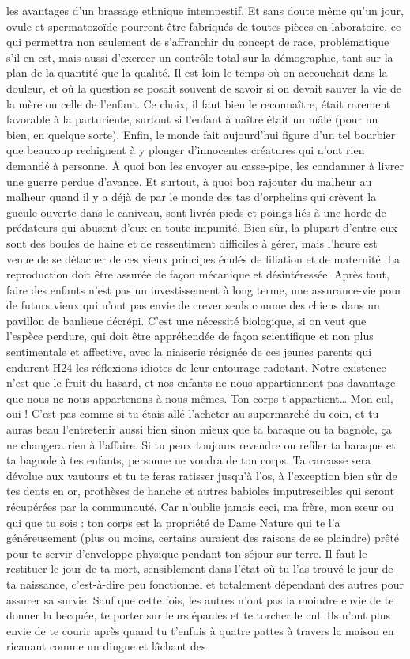 les avantages d’un brassage ethnique intempestif. Et sans doute même qu’un jour, ovule et spermatozoïde pourront être fabriqués de toutes pièces en laboratoire, ce qui permettra non seulement de s’affranchir du concept de race, problématique s’il en est, mais aussi d’exercer un contrôle total sur la démographie, tant sur la plan de la quantité que la qualité. Il est loin le temps où on accouchait dans la douleur, et où la question se posait souvent de savoir si on devait sauver la vie de la mère ou celle de l’enfant. Ce choix, il faut bien le reconnaître, était rarement favorable à la parturiente, surtout si l’enfant à naître était un mâle (pour un bien, en quelque sorte). Enfin, le monde fait aujourd’hui figure d’un tel bourbier que beaucoup rechignent à y plonger d’innocentes créatures qui n’ont rien demandé à personne. À quoi bon les envoyer au casse-pipe, les condamner à livrer une guerre perdue d’avance. Et surtout, à quoi bon rajouter du malheur au malheur quand il y a déjà de par le monde des tas d’orphelins qui crèvent la gueule ouverte dans le caniveau, sont livrés pieds et poings liés à une horde de prédateurs qui abusent d’eux en toute impunité. Bien sûr, la plupart d’entre eux sont des boules de haine et de ressentiment difficiles à gérer, mais l’heure est venue de se détacher de ces vieux principes éculés de filiation et de maternité. La reproduction doit être assurée de façon mécanique et désintéressée. Après tout, faire des enfants n’est pas un investissement à long terme, une assurance-vie pour de futurs vieux qui n’ont pas envie de crever seuls comme des chiens dans un pavillon de banlieue décrépi. C’est une nécessité biologique, si on veut que l’espèce perdure, qui doit être appréhendée de façon scientifique et non plus sentimentale et affective, avec la niaiserie résignée de ces jeunes parents qui endurent H24 les réflexions idiotes de leur entourage radotant. Notre existence n’est que le fruit du hasard, et nos enfants ne nous appartiennent pas davantage que nous ne nous appartenons à nous-mêmes. Ton corps t’appartient… Mon cul, oui ! C’est pas comme si tu étais allé l’acheter au supermarché du coin, et tu auras beau l’entretenir aussi bien sinon mieux que ta baraque ou ta bagnole, ça ne changera rien à l’affaire. Si tu peux toujours revendre ou refiler ta baraque et ta bagnole à tes enfants, personne ne voudra de ton corps. Ta carcasse sera dévolue aux vautours et tu te feras ratisser jusqu’à l’os, à l’exception bien sûr de tes dents en or, prothèses de hanche et autres babioles imputrescibles qui seront récupérées par la communauté. Car n’oublie jamais ceci, ma frère, mon sœur ou qui que tu sois : ton corps est la propriété de Dame Nature qui te l’a généreusement (plus ou moins, certains auraient des raisons de se plaindre) prêté pour te servir d’enveloppe physique pendant ton séjour sur terre. Il faut le restituer le jour de ta mort, sensiblement dans l’état où tu l’as trouvé le jour de ta naissance, c’est-à-dire peu fonctionnel et totalement dépendant des autres pour assurer sa survie. Sauf que cette fois, les autres n’ont pas la moindre envie de te donner la becquée, te porter sur leurs épaules et te torcher le cul. Ils n’ont plus envie de te courir après quand tu t’enfuis à quatre pattes à travers la maison en ricanant comme un dingue et lâchant des 